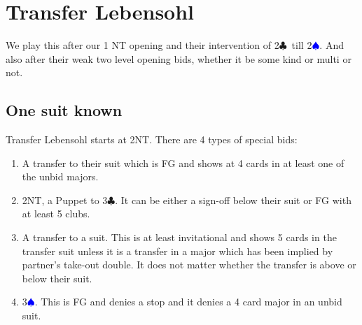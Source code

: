 \documentclass[a4paper]{article}
\newcommand{\BC}{\textcolor{OliveGreen}{$\clubsuit$}}
\newcommand{\BS}{\textcolor{Blue}{$\spadesuit${}}}
\begin{document}
\section{Transfer Lebensohl}

We play this after our 1 NT opening and their intervention of 2\BC\ till
2\BS . And also after their weak two level opening bids, whether it be some kind
or multi or not.
\bigbreak
\subsection{One suit known}

Transfer Lebensohl starts at 2NT. There are 4 types of special bids:
\bigbreak
\begin{enumerate}
\item A transfer to their suit which is FG and shows at 4 cards in at least one
   of the unbid majors.

\item 2NT, a Puppet to 3\BC . It can be either a sign-off below their suit or FG
   with at least 5 clubs.

\item A transfer to a suit. This is at least invitational and
   shows 5 cards in the transfer suit unless it is a transfer in a major which
   has been implied by partner's take-out double. It does not matter whether the transfer
   is above or below their suit.

\item 3\BS . This is FG and denies a stop and it denies a 4 card major in an unbid
   suit.

\end{enumerate}
\bigbreak
\
\bigbreak
\
\end{document}
